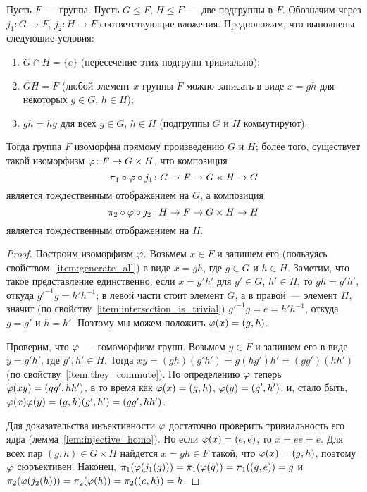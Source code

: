 \begin{theorem}\label{thm:direct_product}
Пусть $F$~--- группа. Пусть $G\leq F$, $H\leq F$~--- две подгруппы в
$F$. Обозначим через $j_1\colon G\to F$, $j_2\colon H\to F$
соответствующие вложения.
Предположим, что выполнены следующие условия:
\begin{enumerate}
\item\label{item:intersection_is_trivial} $G\cap H = \{e\}$
  (пересечение этих подгрупп тривиально);
\item\label{item:generate_all} $GH=F$ (любой элемент $x$ группы $F$
  можно записать в виде $x = gh$ для некоторых $g\in G$, $h\in H$);
\item\label{item:they_commute} $gh=hg$ для всех $g\in G$, $h\in H$
  (подгруппы $G$ и $H$ коммутируют).
\end{enumerate}
Тогда группа $F$ изоморфна прямому произведению $G$ и $H$; более
того, существует такой изоморфизм $\varphi\colon F\to G\times H$,
что композиция
$$
\pi_1\circ\varphi\circ j_1\colon G\to F\to G\times H\to G
$$
является тождественным отображением на $G$, а композиция
$$
\pi_2\circ\varphi\circ j_2\colon H\to F\to G\times H\to H
$$
является тождественным отображением на $H$.
\end{theorem}
\begin{proof}
Построим изоморфизм $\varphi$. Возьмем $x\in F$ и запишем его (пользуясь
свойством~\ref{item:generate_all}) в виде $x = gh$, где $g\in G$ и
$h\in
H$. Заметим, что такое представление единственно: если $x = g'h'$ для
$g'\in G$, $h'\in H$, то $gh=g'h'$, откуда 
$g'^{-1}g = h'h^{-1}$; в левой части стоит элемент $G$, а в правой~---
элемент $H$, значит (по свойству~\ref{item:intersection_is_trivial})
$g'^{-1}g = e = h'h^{-1}$, откуда $g=g'$ и $h=h'$.
Поэтому мы можем положить $\varphi(x) = (g,h)$.

Проверим, что $\varphi$~--- гомоморфизм групп. Возьмем $y\in F$ и запишем
его в виде $y = g'h'$, где $g',h'\in H$.
Тогда $xy = (gh)(g'h') = g(hg')h' = (gg')(hh')$ (по
свойству~\ref{item:they_commute}). По определению $\varphi$ теперь
$\varphi(xy) = (gg',hh')$, в то время как $\varphi(x) = (g,h)$, $\varphi(y) =
(g',h')$, и, стало быть, $\varphi(x)\varphi(y) = (g,h)(g',h') = (gg', hh')$.

Для доказательства инъективности $\varphi$ достаточно проверить
тривиальность его ядра (лемма~\ref{lem:injective_homo}). Но если
$\varphi(x) = (e,e)$, то $x = ee = e$. Для всех пар $(g,h)\in
G\times H$ найдется $x=gh\in F$ такой, что $\varphi(x)=(g,h)$, поэтому
$\varphi$ сюръективен.
Наконец, $\pi_1(\varphi(j_1(g))) = \pi_1(\varphi(g)) = \pi_1((g,e)) = g$ и
$\pi_2(\varphi(j_2(h))) = \pi_2(\varphi(h)) = \pi_2((e,h)) = h$.
\end{proof}


